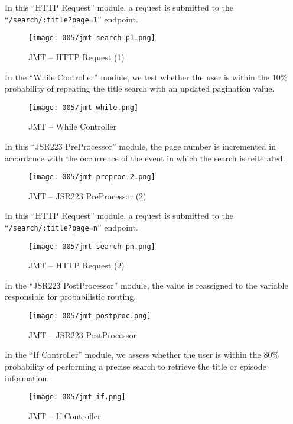 In this ``HTTP Request'' module, a request is submitted to the \newline ``\verb|/search/:title?page=1|'' endpoint.
\begin{figure}[h]
	\centering
	\texttt{[image: 005/jmt-search-p1.png]}
	\caption{JMT -- HTTP Request (1)}
\end{figure}

\clearpage

In the ``While Controller'' module, we test whether the user is within the 10\% probability of repeating the title search with an updated pagination value.
\begin{figure}[h]
	\centering
	\texttt{[image: 005/jmt-while.png]}
	\caption{JMT -- While Controller}
\end{figure}

In this ``JSR223 PreProcessor'' module, the page number is incremented in accordance with the occurrence of the event in which the search is reiterated.
\begin{figure}[h]
	\centering
	\texttt{[image: 005/jmt-preproc-2.png]}
	\caption{JMT -- JSR223 PreProcessor (2)}
\end{figure}

\clearpage

In this ``HTTP Request'' module, a request is submitted to the \newline ``\verb|/search/:title?page=n|'' endpoint.
\begin{figure}[h]
	\centering
	\texttt{[image: 005/jmt-search-pn.png]}
	\caption{JMT -- HTTP Request (2)}
\end{figure}

In the ``JSR223 PostProcessor'' module, the value is reassigned to the variable responsible for probabilistic routing.
\begin{figure}[h]
	\centering
	\texttt{[image: 005/jmt-postproc.png]}
	\caption{JMT -- JSR223 PostProcessor}
\end{figure}

\clearpage

In the ``If Controller'' module, we assess whether the user is within the 80\% probability of performing a precise search to retrieve the title or episode information.
\begin{figure}[h]
	\centering
	\texttt{[image: 005/jmt-if.png]}
	\caption{JMT -- If Controller}
\end{figure}

